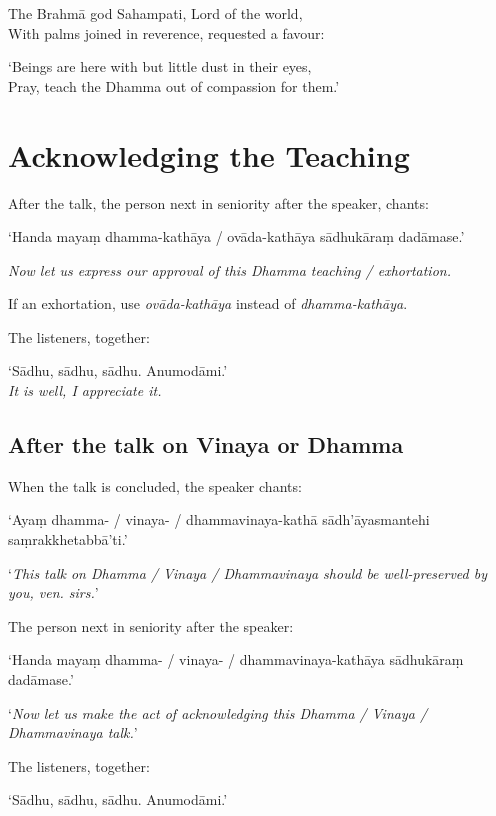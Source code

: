\begin{english}
The Brahmā god Sahampati, Lord of the world,\\
With palms joined in reverence, requested a favour:

`Beings are here with but little dust in their eyes,\\
Pray, teach the Dhamma out of compassion for them.'
\end{english}


\section{Acknowledging the Teaching}

After the talk, the person next in seniority after the speaker, chants:

‘Handa mayaṃ dhamma-kathāya / ovāda-kathāya sādhukāraṃ dadāmase.’

\emph{Now let us express our approval of this Dhamma teaching / exhortation.}

If an exhortation, use \emph{ovāda-kathāya} instead of \emph{dhamma-kathāya}.

The listeners, together:

‘Sādhu, sādhu, sādhu. Anumodāmi.’\\
\emph{It is well, I appreciate it.}

\subsection{After the talk on Vinaya or Dhamma}

When the talk is concluded, the speaker chants:

‘Ayaṃ dhamma- / vinaya- / dhammavinaya-kathā sādh'āyasmantehi saṃrakkhetabbā'ti.’

‘\emph{This talk on Dhamma / Vinaya / Dhammavinaya should be well-preserved by you, ven. sirs.}’

The person next in seniority after the speaker:

‘Handa mayaṃ dhamma- / vinaya- / dhammavinaya-kathāya sādhukāraṃ dadāmase.’

‘\emph{Now let us make the act of acknowledging this Dhamma / Vinaya / Dhammavinaya talk.}’

The listeners, together:

‘Sādhu, sādhu, sādhu. Anumodāmi.’

\ifhandbookedition
\clearpage
\fi

